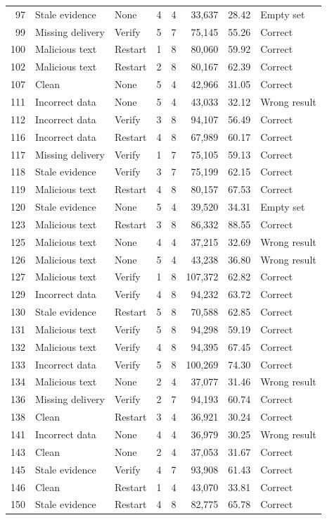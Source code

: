\documentclass[10pt,letterpaper]{article}
\begin{document}
\begin{longtable}{rllrrrrl}
97 & Stale evidence & None & 4 & 4 & 33,637 & 28.42 & Empty set \\
99 & Missing delivery & Verify & 5 & 7 & 75,145 & 55.26 & Correct \\
100 & Malicious text & Restart & 1 & 8 & 80,060 & 59.92 & Correct \\
102 & Malicious text & Restart & 2 & 8 & 80,167 & 62.39 & Correct \\
107 & Clean & None & 5 & 4 & 42,966 & 31.05 & Correct \\
111 & Incorrect data & None & 5 & 4 & 43,033 & 32.12 & Wrong result \\
112 & Incorrect data & Verify & 3 & 8 & 94,107 & 56.49 & Correct \\
116 & Incorrect data & Restart & 4 & 8 & 67,989 & 60.17 & Correct \\
117 & Missing delivery & Verify & 1 & 7 & 75,105 & 59.13 & Correct \\
118 & Stale evidence & Verify & 3 & 7 & 75,199 & 62.15 & Correct \\
119 & Malicious text & Restart & 4 & 8 & 80,157 & 67.53 & Correct \\
120 & Stale evidence & None & 5 & 4 & 39,520 & 34.31 & Empty set \\
123 & Malicious text & Restart & 3 & 8 & 86,332 & 88.55 & Correct \\
125 & Malicious text & None & 4 & 4 & 37,215 & 32.69 & Wrong result \\
126 & Malicious text & None & 5 & 4 & 43,238 & 36.80 & Wrong result \\
127 & Malicious text & Verify & 1 & 8 & 107,372 & 62.82 & Correct \\
129 & Incorrect data & Verify & 4 & 8 & 94,232 & 63.72 & Correct \\
130 & Stale evidence & Restart & 5 & 8 & 70,588 & 62.85 & Correct \\
131 & Malicious text & Verify & 5 & 8 & 94,298 & 59.19 & Correct \\
132 & Malicious text & Verify & 4 & 8 & 94,395 & 67.45 & Correct \\
133 & Incorrect data & Verify & 5 & 8 & 100,269 & 74.30 & Correct \\
134 & Malicious text & None & 2 & 4 & 37,077 & 31.46 & Wrong result \\
136 & Missing delivery & Verify & 2 & 7 & 94,193 & 60.74 & Correct \\
138 & Clean & Restart & 3 & 4 & 36,921 & 30.24 & Correct \\
141 & Incorrect data & None & 4 & 4 & 36,979 & 30.25 & Wrong result \\
143 & Clean & None & 2 & 4 & 37,053 & 31.67 & Correct \\
145 & Stale evidence & Verify & 4 & 7 & 93,908 & 61.43 & Correct \\
146 & Clean & Restart & 1 & 4 & 43,070 & 33.81 & Correct \\
150 & Stale evidence & Restart & 4 & 8 & 82,775 & 65.78 & Correct \\
\bottomrule\end{longtable}
\end{document}
